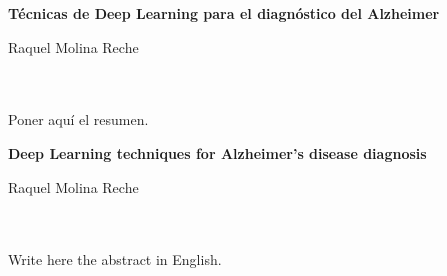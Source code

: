 \thispagestyle{empty}

\begin{center}
{\large\bfseries Técnicas de Deep Learning para el diagnóstico del Alzheimer}\\
\end{center}
\begin{center}
       Raquel Molina Reche\\
\end{center}

\vspace{0.7cm}
\\

\vspace{0.7cm}
\\

Poner aquí el resumen.
\cleardoublepage
\thispagestyle{empty}


\begin{center}
{\large\bfseries Deep Learning techniques for Alzheimer's disease diagnosis}\\
\end{center}
\begin{center}
       Raquel Molina Reche\\
\end{center}

\vspace{0.7cm}
\\

\vspace{0.7cm}
\\

Write here the abstract in English.

%
%
%
%
%
%


